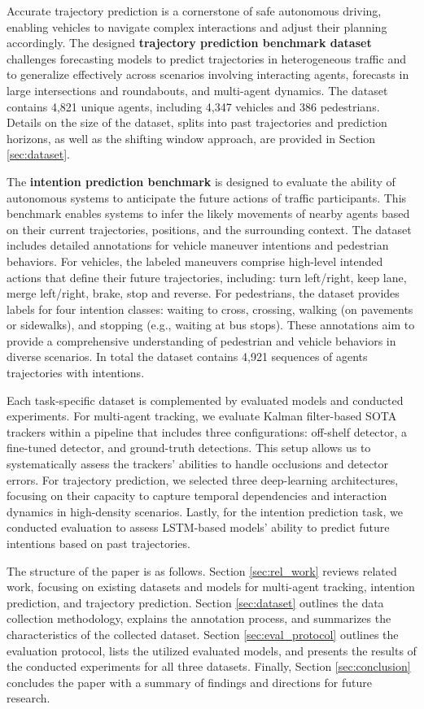 Accurate trajectory prediction is a cornerstone of safe autonomous driving, enabling vehicles to navigate complex interactions and adjust their planning accordingly. The designed \textbf{trajectory prediction benchmark dataset} challenges forecasting models to predict trajectories in heterogeneous traffic and to generalize effectively across scenarios involving interacting agents, forecasts in large intersections and roundabouts, and multi-agent dynamics. The dataset contains 4,821 unique agents, including 4,347 vehicles and 386 pedestrians. Details on the size of the dataset, splits into past trajectories and prediction horizons, as well as the shifting window approach, are provided in Section \ref{sec:dataset}.

The \textbf{intention prediction benchmark} is designed to evaluate the ability of autonomous systems to anticipate the future actions of traffic participants. This benchmark enables systems to infer the likely movements of nearby agents based on their current trajectories, positions, and the surrounding context. The dataset includes detailed annotations for vehicle maneuver intentions and pedestrian behaviors. For vehicles, the labeled maneuvers comprise high-level intended actions that define their future trajectories, including: turn left/right, keep lane, merge left/right, brake, stop and reverse. For pedestrians, the dataset provides labels for four intention classes: waiting to cross, crossing, walking (on pavements or sidewalks), and stopping (e.g., waiting at bus stops). These annotations aim to provide a comprehensive understanding of pedestrian and vehicle behaviors in diverse scenarios. In total the dataset contains 4,921 sequences of agents trajectories with intentions. 

Each task-specific dataset is complemented by evaluated models and conducted experiments. For multi-agent tracking, we evaluate Kalman filter-based SOTA trackers within a pipeline that includes three configurations: off-shelf detector, a fine-tuned detector, and ground-truth detections. This setup allows us to systematically assess the trackers' abilities to handle occlusions and detector errors. For trajectory prediction, we selected three deep-learning architectures, focusing on their capacity to capture temporal dependencies and interaction dynamics in high-density scenarios. Lastly, for the intention prediction task, we conducted evaluation to assess LSTM-based models' ability to predict future intentions based on past trajectories.


The structure of the paper is as follows. Section \ref{sec:rel_work} reviews related work, focusing on existing datasets and models for multi-agent tracking, intention prediction, and trajectory prediction. Section \ref{sec:dataset} outlines the data collection methodology, explains the annotation process, and summarizes the characteristics of the collected dataset. Section \ref{sec:eval_protocol} outlines the evaluation protocol, lists the utilized evaluated models, and presents the results of the conducted experiments for all three datasets. Finally, Section \ref{sec:conclusion} concludes the paper with a summary of findings and directions for future research. 
